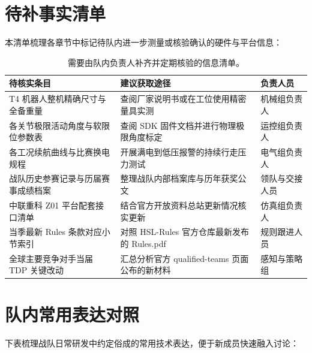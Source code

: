 \section{待补事实清单}

本清单梳理各章节中标记待队内进一步测量或核验确认的硬件与平台信息：

\begin{table}[H]
\centering
\small
\begin{tabularx}{\textwidth}{p{3.8cm} p{6.0cm} X}
\toprule
\textbf{待核实条目} & \textbf{建议获取途径} & \textbf{负责人员} \\
\midrule
T4 机器人整机精确尺寸与全备重量 & 查阅厂家说明书或在工位使用精密量具实测 & 机械组负责人 \\
\addlinespace
各关节极限活动角度与软限位参数表 & 查阅 SDK 固件文档并进行物理极限角度标定 & 运控组负责人 \\
\addlinespace
各工况续航曲线与比赛换电规程 & 开展满电到低压报警的持续行走压力测试 & 电气组负责人 \\
\addlinespace
战队历史参赛记录与历届赛事成绩档案 & 整理战队内部档案库与历年获奖公文 & 领队与交接人员 \\
\addlinespace
中联重科 Z01 平台配套接口清单 & 结合官方开放资料总站更新情况核实更新 & 仿真组负责人 \\
\addlinespace
当季最新 Rules 条款对应小节索引 & 对照 HSL-Rules 官方仓库最新发布的 Rules.pdf & 规则跟进人员 \\
\addlinespace
全球主要竞争对手当届 TDP 关键改动 & 汇总分析官方 qualified-teams 页面公布的新材料 & 感知与策略组 \\
\bottomrule
\end{tabularx}
\caption{需要由队内负责人补齐并定期核验的信息清单。}
\end{table}

\clearpage
\section{队内常用表达对照}

下表梳理战队日常研发中约定俗成的常用技术表达，便于新成员快速融入讨论：

